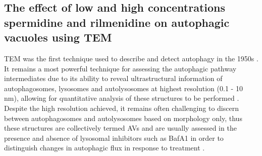 \subsection{The effect of low and high concentrations spermidine and rilmenidine on autophagic vacuoles using TEM}
TEM was the first technique used to describe and detect autophagy in the 1950s \citep{Deter1967}. It remains a most powerful technique for assessing the autophagic pathway intermediates due to its ability to reveal ultrastructural information of autophagosomes, lysosomes and autolysosomes at highest resolution (0.1 - 10 nm), allowing for quantitative analysis of these structures to be performed \citep{klionsky2016}. Despite the high resolution achieved, it remains often challenging to discern between autophagosomes and autolysosomes based on morphology only, thus these structures are collectively termed AVs \citep{Eskelinen2008,klionsky2016} and are usually assessed in the presence and absence of lysosomal inhibitors such as BafA1 in order to distinguish changes in autophagic flux in response to treatment \citep{Eskelinen2011,klionsky2016}.

